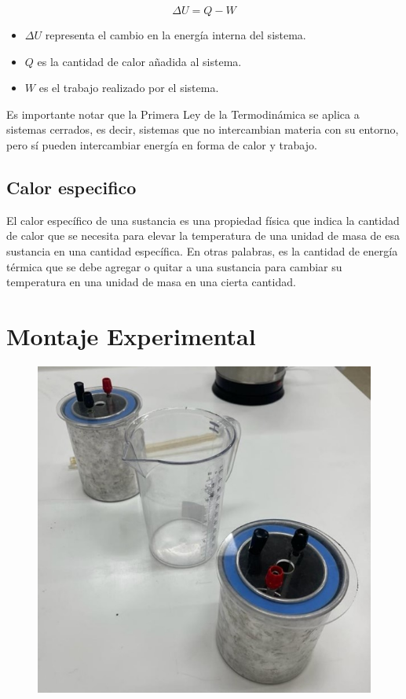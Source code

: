 \documentclass[letterpaper, 12pt]{article}
\begin{document}
\begin{equation*}
      \Delta U = Q - W
\end{equation*}

\begin{itemize}[label=$\triangleright$]
      \item $\Delta U$ representa el cambio en la energía interna del sistema.
      \item $Q$ es la cantidad de calor añadida al sistema.
      \item $W$ es el trabajo realizado por el sistema.
\end{itemize}

Es importante notar que la Primera Ley de la Termodinámica
se aplica a sistemas cerrados, es decir, sistemas que no
intercambian materia con su entorno, pero sí pueden
intercambiar energía en forma de calor y trabajo.

\subsection{Calor especifico}

El calor específico de una sustancia es una propiedad
física que indica la cantidad de calor que se necesita para
elevar la temperatura de una unidad de masa de esa
sustancia en una cantidad específica. En otras palabras, es
la cantidad de energía térmica que se debe agregar o quitar
a una sustancia para cambiar su temperatura en una unidad
de masa en una cierta cantidad.

\section{Montaje Experimental}

\begin{figure}[H]
      \begin{center}
            \includegraphics[width=.5\linewidth]{./Images/Montaje1.jpg}
            \caption{}
      \end{center}
\end{figure}
\end{document}
